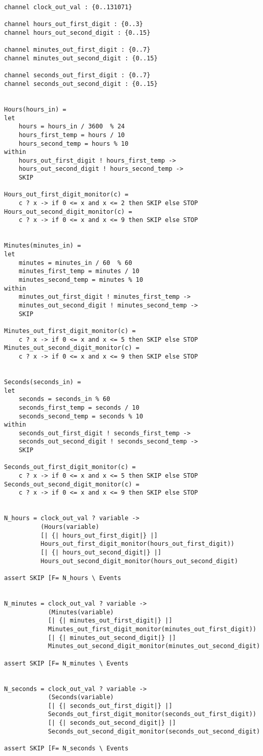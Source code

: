 \begin{verbatim}
channel clock_out_val : {0..131071}

channel hours_out_first_digit : {0..3}
channel hours_out_second_digit : {0..15}

channel minutes_out_first_digit : {0..7}
channel minutes_out_second_digit : {0..15}

channel seconds_out_first_digit : {0..7}
channel seconds_out_second_digit : {0..15}


Hours(hours_in) =
let
    hours = hours_in / 3600  % 24
    hours_first_temp = hours / 10
    hours_second_temp = hours % 10
within
    hours_out_first_digit ! hours_first_temp ->
    hours_out_second_digit ! hours_second_temp ->
    SKIP

Hours_out_first_digit_monitor(c) =
    c ? x -> if 0 <= x and x <= 2 then SKIP else STOP
Hours_out_second_digit_monitor(c) =
    c ? x -> if 0 <= x and x <= 9 then SKIP else STOP


Minutes(minutes_in) =
let
    minutes = minutes_in / 60  % 60
    minutes_first_temp = minutes / 10
    minutes_second_temp = minutes % 10
within
    minutes_out_first_digit ! minutes_first_temp ->
    minutes_out_second_digit ! minutes_second_temp ->
    SKIP

Minutes_out_first_digit_monitor(c) =
    c ? x -> if 0 <= x and x <= 5 then SKIP else STOP
Minutes_out_second_digit_monitor(c) =
    c ? x -> if 0 <= x and x <= 9 then SKIP else STOP


Seconds(seconds_in) =
let
    seconds = seconds_in % 60
    seconds_first_temp = seconds / 10
    seconds_second_temp = seconds % 10
within
    seconds_out_first_digit ! seconds_first_temp ->
    seconds_out_second_digit ! seconds_second_temp ->
    SKIP

Seconds_out_first_digit_monitor(c) =
    c ? x -> if 0 <= x and x <= 5 then SKIP else STOP
Seconds_out_second_digit_monitor(c) =
    c ? x -> if 0 <= x and x <= 9 then SKIP else STOP


N_hours = clock_out_val ? variable ->
          (Hours(variable)
          [| {| hours_out_first_digit|} |]
          Hours_out_first_digit_monitor(hours_out_first_digit))
          [| {| hours_out_second_digit|} |]
          Hours_out_second_digit_monitor(hours_out_second_digit)

assert SKIP [F= N_hours \ Events


N_minutes = clock_out_val ? variable ->
            (Minutes(variable)
            [| {| minutes_out_first_digit|} |]
            Minutes_out_first_digit_monitor(minutes_out_first_digit))
            [| {| minutes_out_second_digit|} |]
            Minutes_out_second_digit_monitor(minutes_out_second_digit)

assert SKIP [F= N_minutes \ Events


N_seconds = clock_out_val ? variable ->
            (Seconds(variable)
            [| {| seconds_out_first_digit|} |]
            Seconds_out_first_digit_monitor(seconds_out_first_digit))
            [| {| seconds_out_second_digit|} |]
            Seconds_out_second_digit_monitor(seconds_out_second_digit)

assert SKIP [F= N_seconds \ Events

\end{verbatim}
